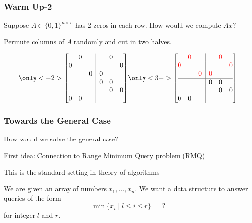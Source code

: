 \documentclass{beamer}
\begin{document}
\begin{frame}
\frametitle{Warm Up-2}

Suppose $A \in \{0,1\}^{n\times n}$ has 2 zeros in each row. How would we compute $Ax$?

\pause
\medskip
Permute columns of $A$ randomly and cut in two halves.

\begin{equation*}\only<-2>{\left[
\begin{array}{@{}ccc|ccc@{}}
     & 0 &  &  & 0 &  \\
    0 &  &  &  &  & 0 \\
     &  & 0 & 0 &  &  \\
     &  &  & 0 & 0 &  \\
     &  &  &  & 0 & 0 \\
     0 & 0 &  &  &  &  \\
    \end{array}
    \right]}
\only<3->{
\left[
\begin{array}{@{}ccc|ccc@{}}
     & \color{red}0 &  &  & \color{red}0 &  \\
    \color{red}0 &  &  &  &  & \color{red}0 \\
     &  & \color{red}0 & \color{red}0 &  &  \\\hline
     &  &  & 0 & 0 &  \\
     &  &  &  & 0 & 0 \\
     0 & 0 &  &  &  &  \\
    \end{array}
    \right]
}
\end{equation*}

\begin{overlayarea}{110mm}{25mm}

\end{overlayarea}



\end{frame}


\begin{frame}
\frametitle{Towards the General Case}

How would we solve the general case?

\medskip
First idea: Connection to Range Minimum Query problem (RMQ)

\medskip
This is the standard setting in theory of algorithms

\medskip
We are given an array of numbers $x_1,\ldots, x_n$. We want a data structure to answer queries of the form 
$$
\min\{x_i \mid l\leq i \leq r\}=\ ?
$$ 
for integer $l$ and $r$.

\end{frame}
\end{document}
